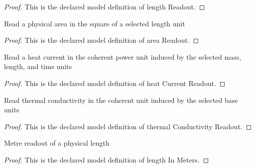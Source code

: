 \begin{proof}
  This is the declared model definition of length Readout.
\end{proof}
\begin{definition}
  \label{def:physics:phyx-mini-0468:phyxminiproblems-problemphyxmini0468-areareadout}
  Read a physical area in the square of a selected length unit
\end{definition}
\begin{proof}
  This is the declared model definition of area Readout.
\end{proof}
\begin{definition}
  \label{def:physics:phyx-mini-0468:phyxminiproblems-problemphyxmini0468-heatcurrentreadout}
  Read a heat current in the coherent power unit induced by the selected mass, length, and time units
\end{definition}
\begin{proof}
  This is the declared model definition of heat Current Readout.
\end{proof}
\begin{definition}
  \label{def:physics:phyx-mini-0468:phyxminiproblems-problemphyxmini0468-thermalconductivityreadout}
  Read thermal conductivity in the coherent unit induced by the selected base units
\end{definition}
\begin{proof}
  This is the declared model definition of thermal Conductivity Readout.
\end{proof}
\begin{definition}
  \label{def:physics:phyx-mini-0468:phyxminiproblems-problemphyxmini0468-lengthinmeters}
  Metre readout of a physical length
\end{definition}
\begin{proof}
  This is the declared model definition of length In Meters.
\end{proof}
